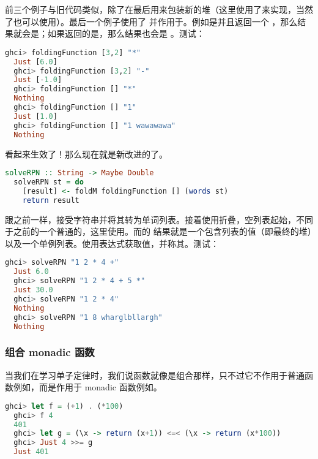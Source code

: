 \documentclass[./main.tex]{subfiles}
\begin{document}
前三个例子与旧代码类似，除了在最后用来包装新的堆（这里使用了来实现，当然了也可以使用）。最后一个例子使用了
并作用于。例如是\acode{[1.o,2.0]}并且返回一个
，那么结果就会是；如果返回的是，那么结果也会是
。测试：

\begin{lstlisting}[language=Haskell]
  ghci> foldingFunction [3,2] "*"
  Just [6.0]
  ghci> foldingFunction [3,2] "-"
  Just [-1.0]
  ghci> foldingFunction [] "*"
  Nothing
  ghci> foldingFunction [] "1"
  Just [1.0]
  ghci> foldingFunction [] "1 wawawawa"
  Nothing
\end{lstlisting}

看起来生效了！那么现在就是新改进的了。

\begin{lstlisting}[language=Haskell]
  solveRPN :: String -> Maybe Double
  solveRPN st = do
    [result] <- foldM foldingFunction [] (words st)
    return result
\end{lstlisting}

跟之前一样，接受字符串并将其转为单词列表。接着使用折叠，空列表起始，不同于之前的一个普通的，这里使用。而的
结果就是一个包含列表的值（即最终的堆）以及一个单例列表。使用表达式获取值，并称其。测试：

\begin{lstlisting}[language=Haskell]
  ghci> solveRPN "1 2 * 4 +"
  Just 6.0
  ghci> solveRPN "1 2 * 4 + 5 *"
  Just 30.0
  ghci> solveRPN "1 2 * 4"
  Nothing
  ghci> solveRPN "1 8 wharglbllargh"
  Nothing
\end{lstlisting}

\subsubsection*{组合 monadic 函数}

当我们在学习单子定律时，我们说\acode{<=<}函数就像是组合那样，只不过它不作用于普通函数例如，而是作用于 monadic 函数例如。

\begin{lstlisting}[language=Haskell]
  ghci> let f = (+1) . (*100)
  ghci> f 4
  401
  ghci> let g = (\x -> return (x+1)) <=< (\x -> return (x*100))
  ghci> Just 4 >>= g
  Just 401
\end{lstlisting}
\end{document}
